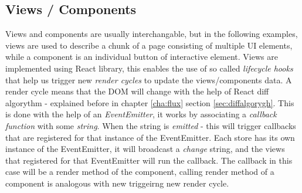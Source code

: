 \subsection*{Views / Components}
Views and components are usually interchangable, but in the following examples, views are used to describe a chunk of a page consisting of multiple UI elements, while a component is an individual button of interactive element. Views are implemented using React library, this enables the use of so called \emph{lifecycle hooks} that help us trigger new \emph{render cycles} to update the views/components data. A render cycle means that the DOM will change with the help of React diff algorythm - explained before in chapter \ref{cha:flux} section \ref{sec:diffalgorygh}. This is done with the help of an \emph{EventEmitter}, it works by associating a \emph{callback function} with some \emph{string}. When the string is \emph{emitted} - this will trigger callbacks that are registered for that instance of the EventEmitter. Each store has its own instance of the EventEmitter, it will broadcast a \emph{change} string, and the views that registered for that EventEmitter will run the callback. The callback in this case will be a render method of the component, calling render method of a component is analogous with new triggeirng new render cycle.

